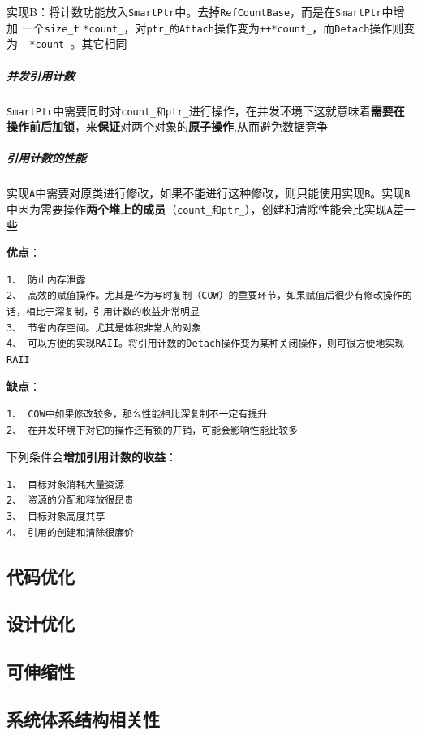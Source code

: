 \documentclass[UTF8,a4paper,12pt]{ctexbook}
\begin{document}
			实现B：将计数功能放入\verb|SmartPtr|中。去掉\verb|RefCountBase|，而是在\verb|SmartPtr|中增加 一个\verb|size_t| \verb|*count_|，对\verb|ptr_的Attach|操作变为\verb|++*count_|，而\verb|Detach|操作则变为\verb|--*count_|。其它相同
			
			\subparagraph{并发引用计数} \verb|SmartPtr|中需要同时对\verb|count_和ptr_|进行操作，在并发环境下这就意味着\textbf{需要在操作前后加锁}，来\textbf{保证}对两个对象的\textbf{原子操作},从而避免数据竞争
			
			\subparagraph{引用计数的性能} 实现\verb|A|中需要对原类进行修改，如果不能进行这种修改，则只能使用实现\verb|B|。实现\verb|B|中因为需要操作\textbf{两个堆上的成员}（\verb|count_和ptr_|），创建和清除性能会比实现\verb|A|差一些
			
			\textbf{优点}：
				\begin{lstlisting}[frame = lbrT]
1、 防止内存泄露
2、 高效的赋值操作。尤其是作为写时复制（COW）的重要环节，如果赋值后很少有修改操作的话，相比于深复制，引用计数的收益非常明显
3、 节省内存空间。尤其是体积非常大的对象
4、 可以方便的实现RAII。将引用计数的Detach操作变为某种关闭操作，则可很方便地实现RAII
				\end{lstlisting}
			
			\textbf{缺点}：
				\begin{lstlisting}[frame = lbrT]
1、 COW中如果修改较多，那么性能相比深复制不一定有提升
2、 在并发环境下对它的操作还有锁的开销，可能会影响性能比较多
				\end{lstlisting}
			
			下列条件会\textbf{增加引用计数的收益}：
				\begin{lstlisting}[frame = lbrT]
1、 目标对象消耗大量资源
2、 资源的分配和释放很昂贵
3、 目标对象高度共享
4、 引用的创建和清除很廉价
				\end{lstlisting}
		\subsection{代码优化}
		\subsection{设计优化}
		\subsection{可伸缩性}
		\subsection{系统体系结构相关性}
\end{document}
